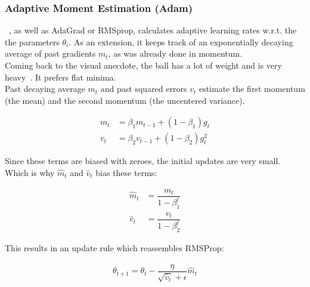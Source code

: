 \subsubsection{Adaptive Moment Estimation (Adam)}~\cite{adam}, as well as AdaGrad or RMSprop, calculates adaptive learning rates w.r.t. the
the parameters $\theta_i$.
As an extension, it keeps track of an exponentially decaying average of past gradients $m_t$, as was already done in
momentum.\\
Coming back to the visual anecdote, the ball has a lot of weight and is very heavy~\cite{optimizersoverview}.
It prefers flat minima.\\
Past decaying average $m_t$ and past squared errors $v_t$ estimate the first momentum (the mean) and the second momentum
(the uncentered variance).

\begin{align}
    m_t &= \beta_1 m_{t-1} + (1 - \beta_1) g_t \label{eqn:adam:1}\\
    v_t &= \beta_2 v_{t-1} + (1 - \beta_2) g_t^2 \label{eqn:adam:2}
\end{align}

Since these terms are biased with zeroes, the initial updates are very small.
Which is why $\hat{m}_t$ and $\hat{v}_t$ bias these terms:

\begin{align}
\hat{m}_t &= \dfrac{m_t}{1 - \beta^t_1} \label{eqn:adam:3}\\
\hat{v}_t &= \dfrac{v_t}{1 - \beta^t_2} \label{eqn:adam:4}
\end{align}

This results in an update rule which reassembles RMSProp:

\begin{align}
    \theta_{t+1} = \theta_{t} - \dfrac{\eta}{\sqrt{\hat{v}_t} + \epsilon} \hat{m}_t \label{eqn:adam:5}
\end{align}

%

